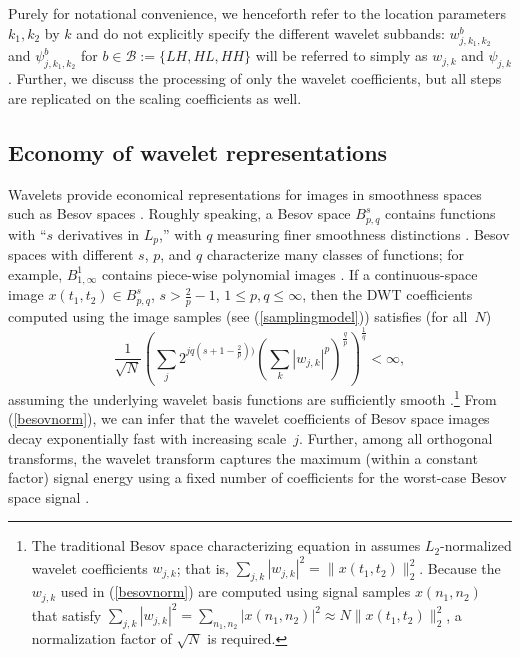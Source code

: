 \documentclass[11pt]{article}
\def\nnnx {n_1}
\def\nnny {n_2}
\def\nnkx {k_1}
\def\nnky {k_2}
\def\nnbothk {k}
\def\tttx {t_1}
\def\ttty {t_2}
\def\NORNSQ{\sqrt{N}}
\begin{document}
Purely for notational convenience, we henceforth refer to the location
parameters $\nnkx,\nnky$ by $k$ and do not explicitly specify the
different wavelet subbands: $w_{j,\nnkx,\nnky}^{b}$ and
$\psi_{j,\nnkx,\nnky}^{b}$ for $b\in{\mathcal{B}}:=\{LH,HL,HH\}$ will
be referred to simply as $w_{j,\nnbothk}$ and
$\psi_{j,\nnbothk}$. Further, we discuss the processing of only the
wavelet coefficients, but all steps are replicated on the scaling
coefficients as well.
\subsection{Economy of wavelet representations}
Wavelets provide economical representations for images in smoothness
spaces such as Besov spaces \cite{DeVore3,Donoho5}. Roughly speaking,
a Besov space $B_{p,q}^{s}$ contains functions with ``$s$ derivatives
in $L_p$,'' with $q$ measuring finer smoothness distinctions
\cite{DeVore3}. Besov spaces with different $s$, $p$, and $q$
characterize many classes of functions; for example,
$B_{1,\infty}^{1}$ contains piece-wise polynomial images
\cite{Kalifaannals}. If a continuous-space image $x(\tttx,\ttty) \in
B_{p,q}^{s}$, $s > \frac{2}{p} - 1$, $ 1 \le p,q \le \infty$, then the
DWT coefficients computed using the image samples (see
(\ref{samplingmodel})) satisfies (for all~$N$)
\begin{equation} 
\frac{1}{\NORNSQ}\left(\sum_j
2^{jq(s+1-\frac{2}{p}))} \left(\sum_{\nnbothk}
|w_{j,\nnbothk}|^{p}\right)^{\frac{q}{p}}\right)^\frac{1}{q} < \infty,  
\label{besovnorm}
\end{equation}
assuming the underlying wavelet basis functions are sufficiently
smooth \cite{Donoho1,donoho99asymptotic,nonlin-soln-don}.\footnote{The
traditional Besov space characterizing equation in
\cite{Donoho1,donoho99asymptotic,nonlin-soln-don} assumes
$L_2$-normalized wavelet coefficients $w_{j,\nnbothk}$; that is,
$\sum_{j,\nnbothk} |w_{j,\nnbothk}|^2 =
\|x(\tttx,\ttty)\|^2_2$. Because the $w_{j,\nnbothk}$ used in
(\ref{besovnorm}) are computed using signal samples $x(\nnnx,\nnny)$
that satisfy $\sum_{j,\nnbothk} |w_{j,\nnbothk}|^2 =
\sum_{\nnnx,\nnny} |x(\nnnx,\nnny)|^2 \approx
N\|x(\tttx,\ttty)\|^2_2$, a normalization factor of $\sqrt{N}$ is
required.} From (\ref{besovnorm}), we can infer that the wavelet
coefficients of Besov space images decay exponentially fast with
increasing scale~$j$.  Further, among all orthogonal transforms,
the wavelet transform captures the maximum (within a constant
factor) signal energy using a fixed number of coefficients for the
worst-case Besov space signal \cite{Donoho5}.
\end{document}
